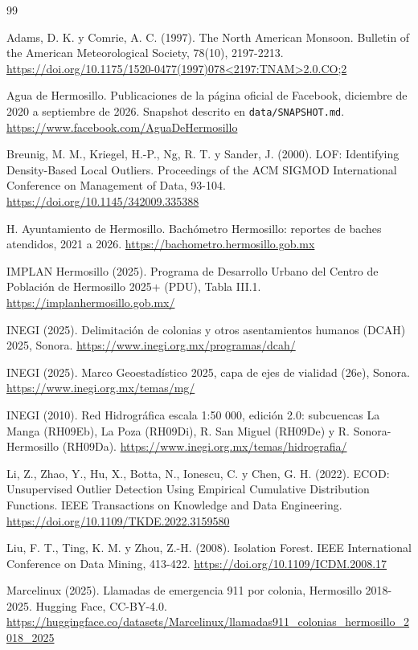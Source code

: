 \documentclass[11pt]{article}
\newcommand{\cod}[1]{\nolinkurl{#1}}
\begin{document}
\begin{thebibliography}{99}
\raggedright

Adams, D. K. y Comrie, A. C. (1997). The North American Monsoon. Bulletin of the American Meteorological Society, 78(10), 2197-2213. \url{https://doi.org/10.1175/1520-0477(1997)078<2197:TNAM>2.0.CO;2}

Agua de Hermosillo. Publicaciones de la página oficial de Facebook, diciembre de 2020 a septiembre de 2026. Snapshot descrito en \cod{data/SNAPSHOT.md}. \url{https://www.facebook.com/AguaDeHermosillo}

Breunig, M. M., Kriegel, H.-P., Ng, R. T. y Sander, J. (2000). LOF: Identifying Density-Based Local Outliers. Proceedings of the ACM SIGMOD International Conference on Management of Data, 93-104. \url{https://doi.org/10.1145/342009.335388}

H. Ayuntamiento de Hermosillo. Bachómetro Hermosillo: reportes de baches atendidos, 2021 a 2026. \url{https://bachometro.hermosillo.gob.mx}

IMPLAN Hermosillo (2025). Programa de Desarrollo Urbano del Centro de Población de Hermosillo 2025+ (PDU), Tabla III.1. \url{https://implanhermosillo.gob.mx/}

INEGI (2025). Delimitación de colonias y otros asentamientos humanos (DCAH) 2025, Sonora. \url{https://www.inegi.org.mx/programas/dcah/}

INEGI (2025). Marco Geoestadístico 2025, capa de ejes de vialidad (26e), Sonora. \url{https://www.inegi.org.mx/temas/mg/}

INEGI (2010). Red Hidrográfica escala 1:50 000, edición 2.0: subcuencas La Manga (RH09Eb), La Poza (RH09Di), R. San Miguel (RH09De) y R. Sonora-Hermosillo (RH09Da). \url{https://www.inegi.org.mx/temas/hidrografia/}

Li, Z., Zhao, Y., Hu, X., Botta, N., Ionescu, C. y Chen, G. H. (2022). ECOD: Unsupervised Outlier Detection Using Empirical Cumulative Distribution Functions. IEEE Transactions on Knowledge and Data Engineering. \url{https://doi.org/10.1109/TKDE.2022.3159580}

Liu, F. T., Ting, K. M. y Zhou, Z.-H. (2008). Isolation Forest. IEEE International Conference on Data Mining, 413-422. \url{https://doi.org/10.1109/ICDM.2008.17}

Marcelinux (2025). Llamadas de emergencia 911 por colonia, Hermosillo 2018-2025. Hugging Face, CC-BY-4.0. \url{https://huggingface.co/datasets/Marcelinux/llamadas911_colonias_hermosillo_2018_2025}


\end{thebibliography}
\end{document}
